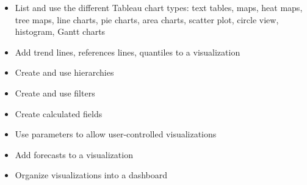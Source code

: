 \documentclass[xcolor=svgnames]{beamer} %
\begin{document}
\begin{frame}
\begin{itemize}
\item List and use the different Tableau chart types: text tables, maps,  heat maps, tree maps, line charts, pie charts, area charts, scatter plot, circle view, histogram, Gantt charts
\item Add trend lines, references lines, quantiles to a visualization
\item Create and use hierarchies
\item Create and use filters
\item Create calculated fields
\item Use parameters to allow user-controlled visualizations
\item Add forecasts to a visualization
\item Organize visualizations into a dashboard

\end{itemize}
\end{frame}
\end{document}
